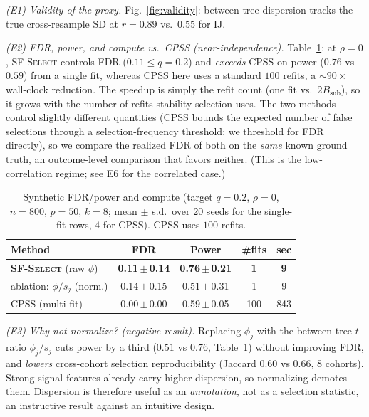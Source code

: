 \documentclass[conference]{IEEEtran}
\begin{document}
\emph{(E1) Validity of the proxy.} Fig.~\ref{fig:validity}: between-tree
dispersion tracks the true cross-resample SD at $r{=}0.89$ vs.\ $0.55$ for IJ.

\emph{(E2) FDR, power, and compute vs.\ CPSS (near-independence).}
Table~\ref{tab:main}: at $\rho{=}0$, \textsc{SF-Select} controls FDR
($0.11\le q{=}0.2$) and \emph{exceeds} CPSS on power ($0.76$ vs $0.59$) from a
single fit, whereas CPSS here uses a standard $100$ refits, a $\sim 90\times$
wall-clock reduction. The speedup is simply the refit count (one fit vs.\
$2B_{\mathrm{sub}}$), so it grows with the number of refits stability selection
uses. The two methods control slightly different quantities (CPSS bounds the
expected number of false selections through a selection-frequency threshold; we
threshold for FDR directly), so we compare the realized FDR of both on the
\emph{same} known ground truth, an outcome-level comparison that favors neither.
(This is the low-correlation regime; see E6 for the correlated case.)

\begin{table}[t]
\caption{Synthetic FDR/power and compute (target $q{=}0.2$, $\rho{=}0$,
$n{=}800$, $p{=}50$, $k{=}8$; mean $\pm$ s.d.\ over $20$ seeds for the single-fit
rows, $4$ for CPSS). CPSS uses $100$ refits.}
\label{tab:main}
\centering\small
\begin{tabular}{lcccc}
\toprule
Method & FDR & Power & \#fits & sec \\
\midrule
\textbf{\textsc{SF-Select}} (raw $\phi$) & \textbf{0.11\,$\pm$\,0.14} & \textbf{0.76\,$\pm$\,0.21} & \textbf{1} & \textbf{9} \\
\quad ablation: $\phi/s_j$ (norm.)       & 0.14\,$\pm$\,0.15 & 0.51\,$\pm$\,0.31 & 1 & 9 \\
CPSS (multi-fit)~\cite{shah2013}         & 0.00\,$\pm$\,0.00 & 0.59\,$\pm$\,0.05 & 100 & 843 \\
\bottomrule
\end{tabular}
\end{table}

\emph{(E3) Why not normalize? (negative result).} Replacing $\phi_j$ with the
between-tree $t$-ratio $\phi_j/s_j$ cuts power by a third ($0.51$ vs $0.76$,
Table~\ref{tab:main}) without improving FDR, and \emph{lowers} cross-cohort
selection reproducibility (Jaccard $0.60$ vs $0.66$, $8$ cohorts). Strong-signal
features already carry higher dispersion, so normalizing demotes them.
Dispersion is therefore useful as an \emph{annotation}, not as a selection
statistic, an instructive result against an intuitive design.
\end{document}
